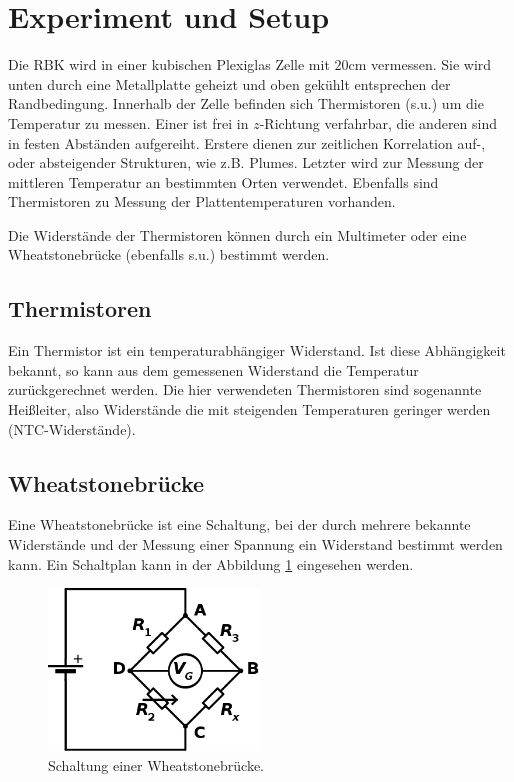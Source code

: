 \documentclass[12pt,a4paper,titlepage,headinclude]{scrartcl}
\numberwithin{equation}{subsection}
\begin{document}
\newpage
\section{Experiment und Setup}
\label{sec:durchfuehrung}

Die RBK wird in einer kubischen Plexiglas Zelle mit $20\si{\centi\meter}$ vermessen.
Sie wird unten durch eine Metallplatte geheizt und oben gekühlt entsprechen der Randbedingung.
Innerhalb der Zelle befinden sich Thermistoren (s.u.) um die Temperatur zu messen.
Einer ist frei in $z$-Richtung verfahrbar, die anderen sind in festen Abständen aufgereiht.
Erstere dienen zur zeitlichen Korrelation auf-, oder absteigender Strukturen, wie z.B. Plumes.
Letzter wird zur Messung der mittleren Temperatur an bestimmten Orten verwendet.
Ebenfalls sind Thermistoren zu Messung der Plattentemperaturen vorhanden.

Die Widerstände der Thermistoren können durch ein Multimeter oder eine Wheatstonebrücke (ebenfalls s.u.) bestimmt werden.

\subsection{Thermistoren}
Ein Thermistor ist ein temperaturabhängiger Widerstand.
Ist diese Abhängigkeit bekannt, so kann aus dem gemessenen Widerstand die Temperatur zurückgerechnet werden.
Die hier verwendeten Thermistoren sind sogenannte Heißleiter, also Widerstände die mit steigenden Temperaturen geringer werden (NTC-Widerstände).

\subsection{Wheatstonebrücke}
Eine Wheatstonebrücke ist eine Schaltung, bei der durch mehrere bekannte Widerstände und der Messung einer Spannung ein Widerstand bestimmt werden kann.
Ein Schaltplan kann in der Abbildung \ref{fig:wheat} eingesehen werden.
\begin{figure}[!ht]
\centering
\includegraphics[width=0.5\textwidth]{Wheatstone.png}
\caption{Schaltung einer Wheatstonebrücke.\protect\footnotemark}
\label{fig:wheat}
\end{figure}
\end{document}
